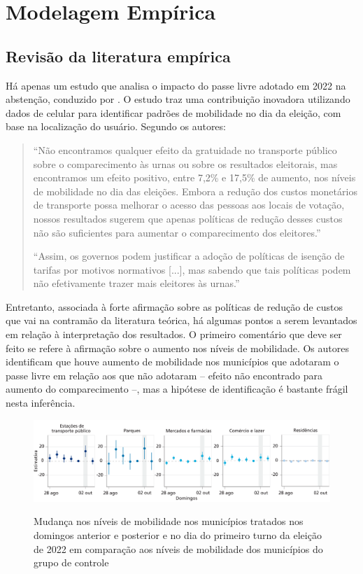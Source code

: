\section{Modelagem Empírica}
\label{sec_modEmp}

\subsection{Revisão da literatura empírica}
\label{subsec_revisao}

Há apenas um estudo que analisa o impacto do passe livre adotado em 2022 na abstenção, conduzido por \cite{pereira2023transporte}. O estudo traz uma contribuição inovadora utilizando dados de celular para identificar padrões de mobilidade no dia da eleição, com base na localização do usuário. Segundo os autores:

\begin{quote}
    ``Não encontramos qualquer efeito da gratuidade no transporte público sobre
    o comparecimento às urnas ou sobre os resultados eleitorais, mas encontramos um efeito positivo,
    entre 7,2\% e 17,5\% de aumento, nos níveis de mobilidade no dia das eleições. Embora a redução
    dos custos monetários de transporte possa melhorar o acesso das pessoas aos locais de votação,
    nossos resultados sugerem que apenas políticas de redução desses custos não são suficientes
    para aumentar o comparecimento dos eleitores.'' 

    ``Assim, os governos podem justificar a adoção de políticas de isenção de tarifas por motivos normativos [...], mas sabendo que tais políticas podem não efetivamente trazer mais eleitores às urnas.''
\end{quote}

Entretanto, associada à forte afirmação sobre as políticas de redução de custos que vai na contramão da literatura teórica, há algumas pontos a serem levantados em relação à interpretação dos resultados. O primeiro comentário que deve ser feito se refere à afirmação sobre o aumento nos níveis de mobilidade. Os autores identificam que houve aumento de mobilidade nos municípios que adotaram o passe livre em relação aos que não adotaram -- efeito não encontrado para aumento do comparecimento --, mas a hipótese de identificação é bastante frágil nesta inferência. 

\begin{figure}[!ht]
  \caption{Mudança nos níveis de mobilidade nos municípios tratados nos domingos anterior e posterior e no dia do primeiro turno da eleição de 2022 em comparação aos níveis de mobilidade dos municípios do grupo de controle}
    \includegraphics[width = \linewidth]{relatorios/passe-livre/graficos/pereira_mob.png}
    \label{fig_pereira_mob}
\end{figure}

